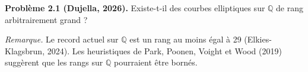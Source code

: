 \textbf{Problème 2.1 (Dujella, 2026).} Existe-t-il des courbes elliptiques sur $\mathbb{Q}$ de rang arbitrairement grand ?

\medskip

\textit{Remarque.} Le record actuel sur $\mathbb{Q}$ est un rang au moins égal à 29 (Elkies-Klagsbrun, 2024). Les heuristiques de Park, Poonen, Voight et Wood (2019) suggèrent que les rangs sur $\mathbb{Q}$ pourraient être bornés.
